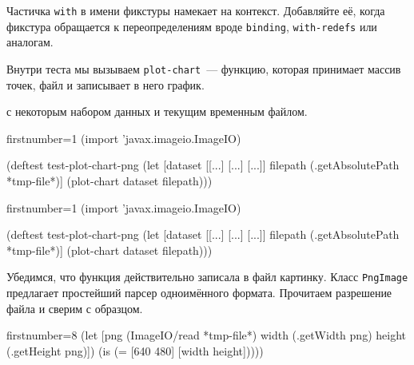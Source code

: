 \fi

Частичка \verb|with| в имени фикстуры намекает на контекст. Добавляйте её, когда
фикстура обращается к переопределениям вроде \verb|binding|, \verb|with-redefs|
или аналогам.


Внутри теста мы вызываем \verb|plot-chart|~--- функцию, которая принимает массив
точек, файл и записывает в него график.



 с некоторым набором данных и текущим
временным файлом.

\ifx\DEVICETYPE\MOBILE

\begin{english}
  \begin{clojure/lines*}{firstnumber=1}
(import 'javax.imageio.ImageIO)

(deftest test-plot-chart-png
 (let [dataset [[...] [...] [...]]
       filepath (.getAbsolutePath
                          *tmp-file*)]
   (plot-chart dataset filepath)))
  \end{clojure/lines*}
\end{english}

\else

\begin{english}
  \begin{clojure/lines*}{firstnumber=1}
(import 'javax.imageio.ImageIO)

(deftest test-plot-chart-png
  (let [dataset [[...] [...] [...]]
        filepath (.getAbsolutePath *tmp-file*)]
    (plot-chart dataset filepath)))
  \end{clojure/lines*}
\end{english}

\fi

\wavebottom

\noindent
Убедимся, что функция действительно записала в файл картинку. Класс
\verb|PngImage| предлагает простейший парсер одноимённого формата. Прочитаем
разрешение файла и сверим с образцом.

\wavetop

\ifx\DEVICETYPE\MOBILE

\begin{english}
  \begin{clojure/lines*}{firstnumber=8}
(let [png (ImageIO/read *tmp-file*)
      width (.getWidth png)
      height (.getHeight png)])
(is (= [640 480] [width height]))))
  \end{clojure/lines*}
\end{english}

